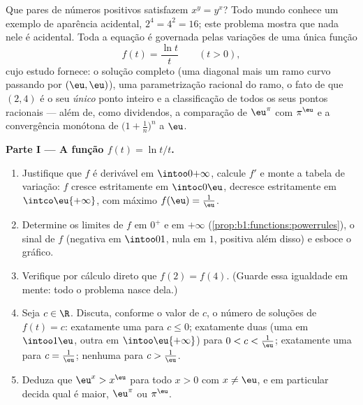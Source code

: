 \begin{problem}\label{pb:b1:functions:1}
Que pares de números positivos satisfazem $x^y = y^x$? Todo mundo conhece
um exemplo de aparência acidental, $2^4 = 4^2 = 16$; este problema mostra
que nada nele é acidental. Toda a equação é governada
pelas variações de uma única função
\[
f(t) = \frac{\ln t}{t} \qquad (t > 0),
\]
cujo estudo fornece: o  solução completo (uma diagonal mais um
ramo curvo passando por $(\eu, \eu)$), uma parametrização racional do
ramo, o fato de que $(2, 4)$ é o seu \emph{único} ponto inteiro
e a classificação de todos os seus pontos racionais --- além de, como
dividendos, a comparação de $\eu^\pi$ com $\pi^\eu$ e a
convergência monótona de $\bigl(1 + \frac1n\bigr)^n$ a $\eu$.

\medskip
\noindent\textbf{Parte I --- A função $f(t) = \ln t / t$.}
\begin{enumerate}
  \item Justifique que $f$ é derivável em $\intoo0{+\infty}$,
        calcule $f'$ e monte a tabela de variação: $f$
        cresce estritamente em $\intoc0\eu$, decresce estritamente em
        $\intco\eu{+\infty}$, com máximo $f(\eu) = \frac1\eu$.
  \item Determine os limites de $f$ em $0^+$ e em $+\infty$
        (\cref{prop:b1:functions:powerrules}), o sinal de $f$
        (negativa em $\intoo01$, nula em $1$, positiva além disso)
        e esboce o gráfico.
  \item Verifique por cálculo direto que $f(2) = f(4)$. (Guarde essa
        igualdade em mente: todo o problema nasce dela.)
  \item Seja $c \in \R$. Discuta, conforme o valor de $c$, o
        número de soluções de $f(t) = c$: exatamente uma para $c \leq
        0$; exatamente duas (uma em $\intoo1\eu$, outra em
        $\intoo\eu{+\infty}$) para $0 < c < \frac1\eu$; exatamente uma
        para $c = \frac1\eu$; nenhuma para $c > \frac1\eu$.
  \item Deduza que $\eu^x > x^\eu$ para todo $x > 0$ com $x \neq
        \eu$, e em particular decida qual é maior, $\eu^\pi$ ou
        $\pi^\eu$.
\end{enumerate}


\end{problem}
